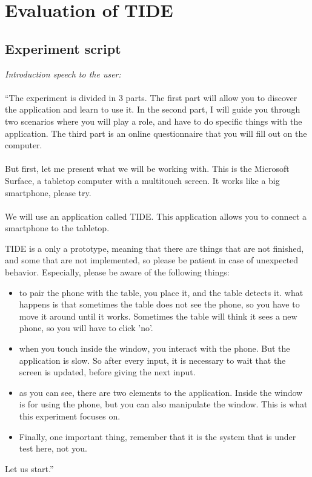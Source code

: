 \chapter{Evaluation of TIDE}

\section{Experiment script}
\label{app:evalscript}

\emph{Introduction speech to the user:}
\\\\
``The experiment is divided in 3 parts.
The first part will allow you to discover the application and learn to use it.
In the second part, I will guide you through two scenarios where you will play a role, and have to do specific things with the application.
The third part is an online questionnaire that you will fill out on the computer.
\\\\
But first, let me present what we will be working with.
This is the Microsoft Surface, a tabletop computer with a multitouch screen.
It works like a big smartphone, please try.
\\\\
We will use an application called TIDE.
This application allows you to connect a smartphone to the tabletop.

TIDE is a only a prototype, meaning that there are things that are not finished, and some that are not implemented, so please be patient in case of unexpected behavior.
Especially, please be aware of the following things:
\begin{itemize}
\item to pair the phone with the table, you place it, and the table detects it. what happens is that sometimes the table does not see the phone, so you have to move it around until it works. Sometimes the table will think it sees a new phone, so you will have to click 'no'.
\item when you touch inside the window, you interact with the phone. But the application is slow. So after every input, it is necessary to wait that the screen is updated, before giving the next input.
\item as you can see, there are two elements to the application. Inside the window is for using the phone, but you can also manipulate the window. This is what this experiment focuses on.
\item Finally, one important thing, remember that it is the system that is under test here, not you.
\end{itemize}
Let us start.''

